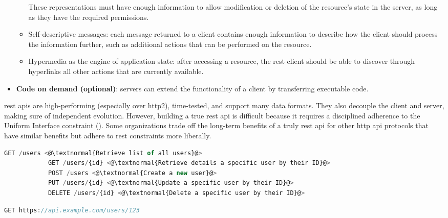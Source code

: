 \begin{multicols}{2}
\begin{itemize}
\begin{itemize}
                              These representations must have enough information to allow modification or deletion of the resource's
                              state in the server, as long as they have the required permissions.
                        \item Self-descriptive messages: each message returned to a client contains enough information to describe
                              how the client should process the information further, such as additional actions that can be
                              performed on the resource.
                        \item Hypermedia as the engine of application state: after accessing a resource, the \acrshort{rest} client
                              should be able to discover through hyperlinks all other actions that are currently available.
                  \end{itemize}
            \item \textbf{Code on demand (optional)}: servers can extend the functionality of a client by transferring
                  executable code.
      \end{itemize}
      \acrshort{rest} \acrshort{api}s are high-performing (especially over \acrshort{http}2), time-tested, and support
      many data formats. They also decouple the client and server, making sure of independent evolution. However,
      building a true \acrshort{rest} \acrshort{api} is difficult because it requires a disciplined adherence to the
      Uniform Interface constraint (\cite{restapiuniforminterface}). Some organizations trade off the long-term benefits
      of a truly \acrshort{rest} \acrshort{api} for other \acrshort{http} \acrshort{api} protocols that have similar
      benefits but adhere to \acrshort{rest} constraints more liberally.
\end{multicols}
\begin{lstlisting}[language=JavaScript, caption=Different HTTP methods in REST]
            GET /users <@\textnormal{Retrieve list of all users}@>
            GET /users/{id} <@\textnormal{Retrieve details a specific user by their ID}@>
            POST /users <@\textnormal{Create a new user}@>
            PUT /users/{id} <@\textnormal{Update a specific user by their ID}@>
            DELETE /users/{id} <@\textnormal{Delete a specific user by their ID}@>
      \end{lstlisting}
\begin{lstlisting}[language=JavaScript, caption=REST's Example]
            GET https://api.example.com/users/123
      \end{lstlisting}
